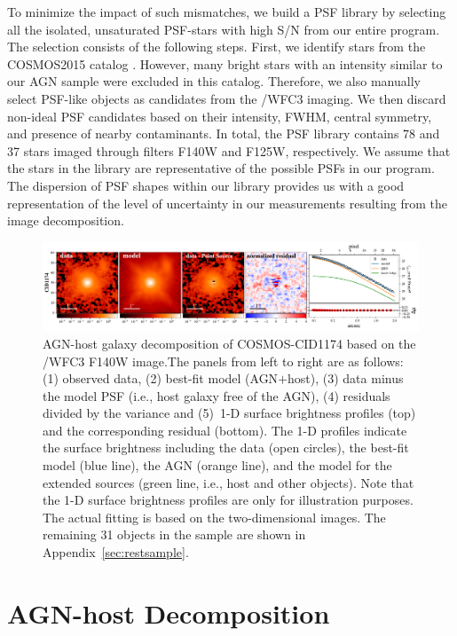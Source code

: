 \documentclass[apj]{emulateapj}
\begin{document}
To minimize the impact of such mismatches, we build a PSF library by selecting all the isolated, unsaturated PSF-stars with high S/N from our entire program. The selection consists of the following steps. First, we identify stars from the COSMOS2015 catalog \citep{Laigle2016}. However, many bright stars with an intensity similar to our AGN sample were excluded in this catalog. Therefore, we also manually select PSF-like objects as candidates from the \hst/WFC3 imaging. We then discard non-ideal PSF candidates based on their intensity, FWHM, central symmetry, and presence of nearby contaminants. In total, the PSF library contains 78 and 37 stars imaged through filters F140W and F125W, respectively. We assume that the stars in the library are representative of the possible PSFs in our program. The dispersion of PSF shapes within our library provides us with a good representation of the level of uncertainty in our measurements resulting from the image decomposition.

\begin{figure}
\centering
{
\includegraphics[height=0.25\textwidth]{fig/best_fit_CID1174_SB_profile.pdf}
\caption{\label{fig:AGN_decomp} AGN-host galaxy decomposition of COSMOS-CID1174 based on the \hst/WFC3 F140W image.The panels from left to right are as follows: (1) observed data, (2) best-fit model (AGN$+$host), (3) data minus the model PSF (i.e., host galaxy free of the AGN), (4) residuals divided by the variance and (5)~1-D surface brightness profiles (top) and the corresponding residual (bottom). The 1-D profiles indicate the surface brightness including the data (open circles), the best-fit model (blue line), the AGN (orange line), and the model for the extended sources (green line, i.e., host and other objects). Note that the 1-D surface brightness profiles are only for illustration purposes. The actual fitting is based on the two-dimensional images. The remaining 31 objects in the sample are shown in Appendix~\ref{sec:restsample}.
}}
\end{figure} 

\section{AGN-host Decomposition}
\label{sec:analysis}
\end{document}
